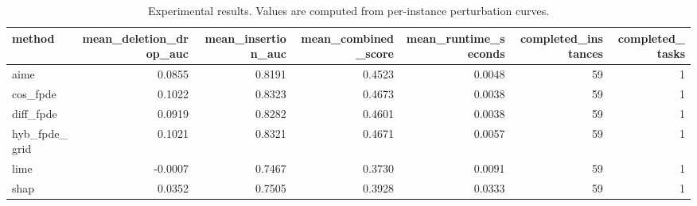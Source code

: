 \begin{table}[t]
\caption{Experimental results. Values are computed from per-instance perturbation curves.}
\label{tab:main_results_computed}
\centering
\begin{tabular}{lrrrrrr}
\toprule
method & mean\_deletion\_drop\_auc & mean\_insertion\_auc & mean\_combined\_score & mean\_runtime\_seconds & completed\_instances & completed\_tasks \\
\midrule
aime & 0.0855 & 0.8191 & 0.4523 & 0.0048 & 59 & 1 \\
cos\_fpde & 0.1022 & 0.8323 & 0.4673 & 0.0038 & 59 & 1 \\
diff\_fpde & 0.0919 & 0.8282 & 0.4601 & 0.0038 & 59 & 1 \\
hyb\_fpde\_grid & 0.1021 & 0.8321 & 0.4671 & 0.0057 & 59 & 1 \\
lime & -0.0007 & 0.7467 & 0.3730 & 0.0091 & 59 & 1 \\
shap & 0.0352 & 0.7505 & 0.3928 & 0.0333 & 59 & 1 \\
\bottomrule
\end{tabular}

\end{table}
